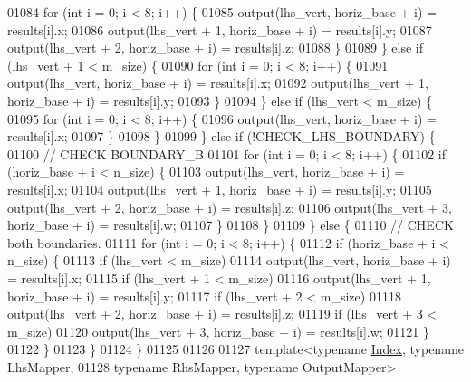 \begin{DoxyCode}
01084       \textcolor{keywordflow}{for} (\textcolor{keywordtype}{int} i = 0; i < 8; i++) \{
01085         output(lhs\_vert, horiz\_base + i) = results[i].x;
01086         output(lhs\_vert + 1, horiz\_base + i) = results[i].y;
01087         output(lhs\_vert + 2, horiz\_base + i) = results[i].z;
01088       \}
01089     \} \textcolor{keywordflow}{else} \textcolor{keywordflow}{if} (lhs\_vert + 1 < m\_size) \{
01090       \textcolor{keywordflow}{for} (\textcolor{keywordtype}{int} i = 0; i < 8; i++) \{
01091         output(lhs\_vert, horiz\_base + i) = results[i].x;
01092         output(lhs\_vert + 1, horiz\_base + i) = results[i].y;
01093       \}
01094     \} \textcolor{keywordflow}{else} \textcolor{keywordflow}{if} (lhs\_vert  < m\_size) \{
01095       \textcolor{keywordflow}{for} (\textcolor{keywordtype}{int} i = 0; i < 8; i++) \{
01096         output(lhs\_vert, horiz\_base + i) = results[i].x;
01097       \}
01098     \}
01099   \} \textcolor{keywordflow}{else} \textcolor{keywordflow}{if} (!CHECK\_LHS\_BOUNDARY) \{
01100     \textcolor{comment}{// CHECK BOUNDARY\_B}
01101     \textcolor{keywordflow}{for} (\textcolor{keywordtype}{int} i = 0; i < 8; i++) \{
01102       \textcolor{keywordflow}{if} (horiz\_base + i < n\_size) \{
01103         output(lhs\_vert, horiz\_base + i) = results[i].x;
01104         output(lhs\_vert + 1, horiz\_base + i) = results[i].y;
01105         output(lhs\_vert + 2, horiz\_base + i) = results[i].z;
01106         output(lhs\_vert + 3, horiz\_base + i) = results[i].w;
01107       \}
01108     \}
01109   \} \textcolor{keywordflow}{else} \{
01110     \textcolor{comment}{// CHECK both boundaries.}
01111     \textcolor{keywordflow}{for} (\textcolor{keywordtype}{int} i = 0; i < 8; i++) \{
01112       \textcolor{keywordflow}{if} (horiz\_base + i < n\_size) \{
01113         \textcolor{keywordflow}{if} (lhs\_vert < m\_size)
01114           output(lhs\_vert, horiz\_base + i) = results[i].x;
01115         \textcolor{keywordflow}{if} (lhs\_vert + 1 < m\_size)
01116           output(lhs\_vert + 1, horiz\_base + i) = results[i].y;
01117         \textcolor{keywordflow}{if} (lhs\_vert + 2 < m\_size)
01118           output(lhs\_vert + 2, horiz\_base + i) = results[i].z;
01119         \textcolor{keywordflow}{if} (lhs\_vert + 3 < m\_size)
01120           output(lhs\_vert + 3, horiz\_base + i) = results[i].w;
01121       \}
01122     \}
01123   \}
01124 \}
01125 
01126 
01127 \textcolor{keyword}{template}<\textcolor{keyword}{typename} \hyperlink{namespace_eigen_a62e77e0933482dafde8fe197d9a2cfde}{Index}, \textcolor{keyword}{typename} LhsMapper,
01128          \textcolor{keyword}{typename} RhsMapper, \textcolor{keyword}{typename} OutputMapper>

\end{DoxyCode}
